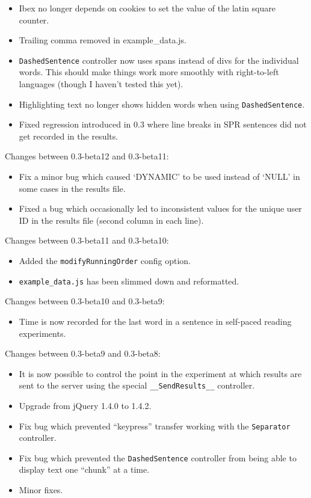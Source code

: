 \documentclass[]{article}
\begin{document}
\begin{itemize}
\itemsep1pt\parskip0pt
\item
  Ibex no longer depends on cookies to set the value of the latin square
  counter.
\item
  Trailing comma removed in example\_data.js.
\item
  \texttt{DashedSentence} controller now uses spans instead of divs for
  the individual words. This should make things work more smoothly with
  right-to-left languages (though I haven't tested this yet).
\item
  Highlighting text no longer shows hidden words when using
  \texttt{DashedSentence}.
\item
  Fixed regression introduced in 0.3 where line breaks in SPR sentences
  did not get recorded in the results.
\end{itemize}

Changes between 0.3-beta12 and 0.3-beta11:

\begin{itemize}
\itemsep1pt\parskip0pt
\item
  Fix a minor bug which caused `DYNAMIC' to be used instead of `NULL' in
  some cases in the results file.
\item
  Fixed a bug which occasionally led to inconsistent values for the
  unique user ID in the results file (second column in each line).
\end{itemize}

Changes between 0.3-beta11 and 0.3-beta10:

\begin{itemize}
\itemsep1pt\parskip0pt
\item
  Added the \texttt{modifyRunningOrder} config option.
\item
  \texttt{example\_data.js} has been slimmed down and reformatted.
\end{itemize}

Changes between 0.3-beta10 and 0.3-beta9:

\begin{itemize}
\itemsep1pt\parskip0pt
\item
  Time is now recorded for the last word in a sentence in self-paced
  reading experiments.
\end{itemize}

Changes between 0.3-beta9 and 0.3-beta8:

\begin{itemize}
\itemsep1pt\parskip0pt
\item
  It is now possible to control the point in the experiment at which
  results are sent to the server using the special
  \texttt{\_\_SendResults\_\_} controller.
\item
  Upgrade from jQuery 1.4.0 to 1.4.2.
\item
  Fix bug which prevented ``keypress'' transfer working with the
  \texttt{Separator} controller.
\item
  Fix bug which prevented the \texttt{DashedSentence} controller from
  being able to display text one ``chunk'' at a time.
\item
  Minor fixes.
\end{itemize}
\end{document}
